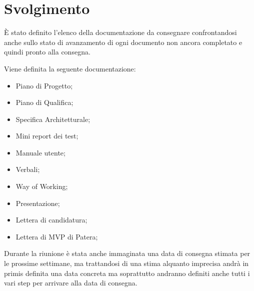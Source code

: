 \section{Svolgimento}

È stato definito l'elenco della documentazione da consegnare confrontandosi anche sullo stato di avanzamento di ogni documento non ancora completato e quindi pronto alla consegna.

Viene definita la seguente documentazione:

\begin{itemize}
    \item Piano di Progetto;
    \item Piano di Qualifica;
    \item Specifica Architetturale;
    \item Mini report dei test;
    \item Manuale utente;
    \item Verbali;
    \item Way of Working;
    \item Presentazione;
    \item Lettera di candidatura;
    \item Lettera di MVP di Patera;
\end{itemize}

Durante la riunione è stata anche immaginata una data di consegna stimata per le prossime settimane, ma trattandosi di una stima alquanto imprecisa andrà in primis definita una data concreta ma soprattutto andranno definiti anche tutti i vari step per arrivare alla data di consegna. 